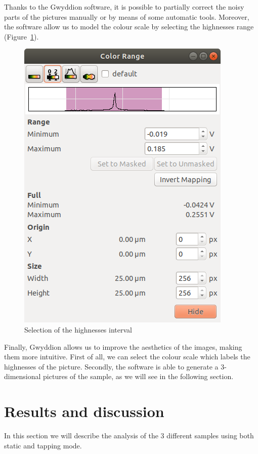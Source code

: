 \documentclass[11pt,a4paper]{article}
\begin{document}
Thanks to the Gwyddion software, it is possible to partially correct the noisy parts of the pictures manually or by means of some automatic tools. Moreover, the software allow us to model the colour scale by selecting the highnesses range (Figure~\ref{fig:scale_selection}).
\begin{figure}[ht]
\begin{center}
\includegraphics[scale=0.4]{scale_selection}
\caption{Selection of the highnesses interval}\label{fig:scale_selection}
\end{center}
\end{figure}

Finally, Gwyddion allows us to improve the aesthetics of the images, making them more intuitive. First of all, we can select the colour scale which labels the highnesses of the picture. Secondly, the software is able to generate a 3-dimensional pictures of the sample, as we will see in the following section.


\section{Results and discussion}
In this section we will describe the analysis of the 3 different samples using both static and tapping mode.
\end{document}
